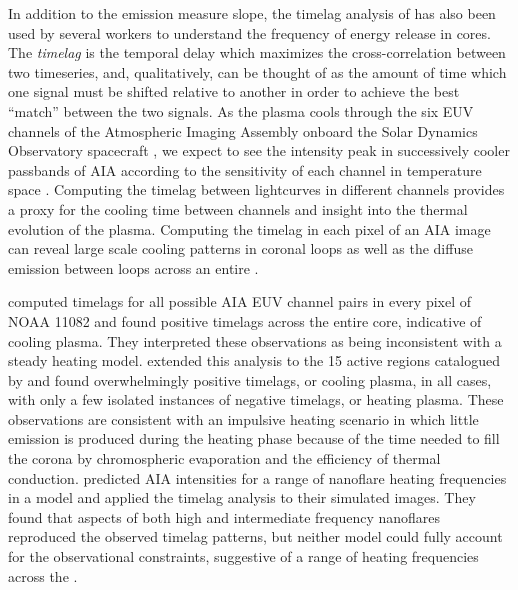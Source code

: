 In addition to the emission measure slope, the timelag analysis of \citet{viall_evidence_2012} has also been used by several workers to understand the frequency of energy release in \AR{} cores. The \textit{timelag} is the temporal delay which maximizes the cross-correlation between two timeseries, and, qualitatively, can be thought of as the amount of time which one signal must be shifted relative to another in order to achieve the best ``match'' between the two signals. As the plasma cools through the six EUV channels of the Atmospheric Imaging Assembly \citep[AIA,][]{lemen_atmospheric_2012} onboard the Solar Dynamics Observatory spacecraft \citep[SDO,][]{pesnell_solar_2012}, we expect to see the intensity peak in successively cooler passbands of AIA according to the sensitivity of each channel in temperature space \citep{viall_patterns_2011}. Computing the timelag between lightcurves in different channels provides a proxy for the cooling time between channels and insight into the thermal evolution of the plasma. Computing the timelag in each pixel of an AIA image can reveal large scale cooling patterns in coronal loops as well as the diffuse emission between loops across an entire \AR{}.

\citet{viall_evidence_2012} computed timelags for all possible AIA EUV channel pairs in every pixel of \AR{} NOAA 11082 and found positive timelags across the entire \AR{} core, indicative of cooling plasma. They interpreted these observations as being inconsistent with a steady heating model. \citet{viall_survey_2017} extended this analysis to the 15 active regions catalogued by \citet{warren_systematic_2012} and found overwhelmingly positive timelags, or cooling plasma, in all cases, with only a few isolated instances of negative timelags, or heating plasma. These observations are consistent with an impulsive heating scenario in which little emission is produced during the heating phase because of the time needed to fill the corona by chromospheric evaporation and the efficiency of thermal conduction. \citet{bradshaw_patterns_2016} predicted AIA intensities for a range of nanoflare heating frequencies in a model \AR{} and applied the timelag analysis to their simulated images. They found that aspects of both high and intermediate frequency nanoflares reproduced the observed timelag patterns, but neither model could fully account for the observational constraints, suggestive of a range of heating frequencies across the \AR{}.

